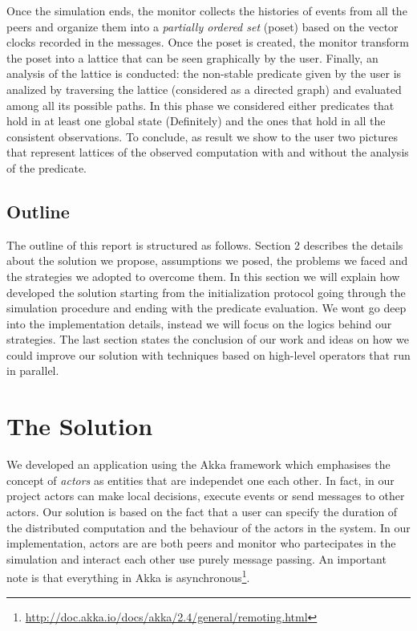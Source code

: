 \documentclass[11pt]{article}
\begin{document}
Once the simulation ends, the monitor collects the histories of events from all the peers and organize them into a \textit{partially ordered set} (poset) based on the vector clocks recorded in the messages. Once the poset is created, the monitor transform the poset into a lattice that can be seen graphically by the user. Finally, an analysis of the lattice is conducted: the non-stable predicate given by the user is analized by traversing the lattice (considered as a directed graph) and evaluated among all its possible paths. In this phase we considered either predicates that hold in at least one global state (Definitely) and the ones that hold in all the consistent observations. To conclude, as result we show to the user two pictures that represent lattices of the observed computation with and without the analysis of the predicate.

\subsection{Outline}

The outline of this report is structured as follows. Section 2 describes the details about the solution we propose, assumptions we posed, the problems we faced and the strategies we adopted to overcome them. In this section we will explain how developed the solution starting from the initialization protocol going through the simulation procedure and ending with the predicate evaluation. We wont go deep into the implementation details, instead we will focus on the logics behind our strategies. The last section states the conclusion of our work and ideas on how we could improve our solution with techniques based on high-level operators that run in parallel.

\newpage

\section{The Solution}

We developed an application using the Akka framework which emphasises the concept of \textit{actors} as entities that are independet one each other. In fact, in our project actors can make local decisions, execute events or send messages to other actors. Our solution is based on the fact that a user can specify the duration of the distributed computation and the behaviour of the actors in the system. In our implementation, actors are are both peers and monitor who partecipates in the simulation and interact each other use purely message passing. An important note is that everything in Akka is asynchronous\footnote{\url{http://doc.akka.io/docs/akka/2.4/general/remoting.html}}.
\end{document}
